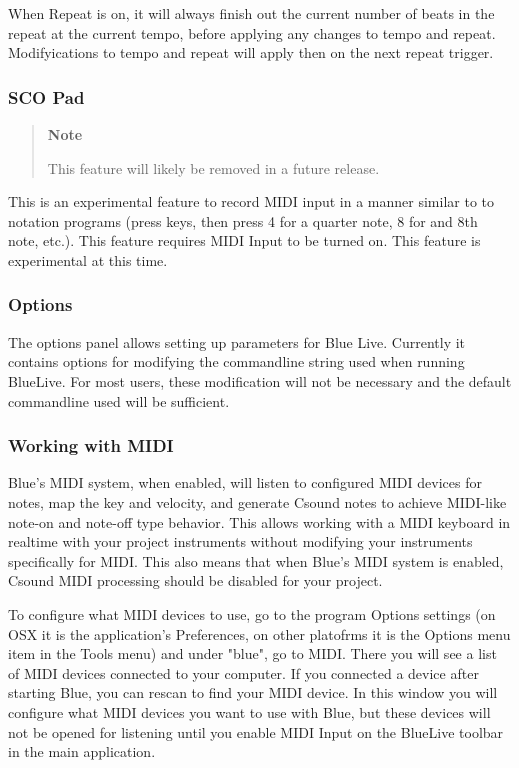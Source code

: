 When Repeat is on, it will always finish out the current number of beats
in the repeat at the current tempo, before applying any changes to tempo
and repeat. Modifyications to tempo and repeat will apply then on the
next repeat trigger.

\subsubsection{SCO Pad}

\begin{quote}
\textbf{Note}

This feature will likely be removed in a future release.
\end{quote}

This is an experimental feature to record MIDI input in a manner similar
to to notation programs (press keys, then press 4 for a quarter note, 8
for and 8th note, etc.). This feature requires MIDI Input to be turned
on. This feature is experimental at this time.

\subsubsection{Options}

The options panel allows setting up parameters for Blue Live. Currently
it contains options for modifying the commandline string used when
running BlueLive. For most users, these modification will not be
necessary and the default commandline used will be sufficient.

\subsubsection{Working with MIDI}

Blue's MIDI system, when enabled, will listen to configured MIDI devices
for notes, map the key and velocity, and generate Csound notes to
achieve MIDI-like note-on and note-off type behavior. This allows
working with a MIDI keyboard in realtime with your project instruments
without modifying your instruments specifically for MIDI. This also
means that when Blue's MIDI system is enabled, Csound MIDI processing
should be disabled for your project.

To configure what MIDI devices to use, go to the program Options
settings (on OSX it is the application's Preferences, on other platofrms
it is the Options menu item in the Tools menu) and under "blue", go to
MIDI. There you will see a list of MIDI devices connected to your
computer. If you connected a device after starting Blue, you can rescan
to find your MIDI device. In this window you will configure what MIDI
devices you want to use with Blue, but these devices will not be opened
for listening until you enable MIDI Input on the BlueLive toolbar in the
main application.

